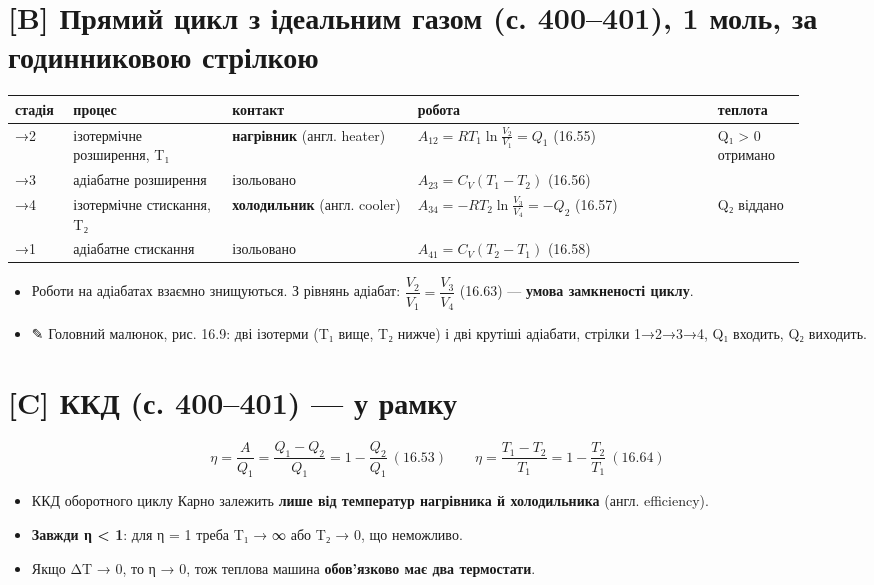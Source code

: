 \documentclass[11pt,a4paper,oneside]{book}
\newcommand{\pen}{{\sffamily\color{accent}✎}}
\begin{document}
\section*{[B] Прямий цикл з ідеальним газом (с. 400–401), 1 моль, за годинниковою стрілкою}
{\footnotesize
\begin{longtable}{>{\raggedright\arraybackslash}p{0.069\linewidth}>{\raggedright\arraybackslash}p{0.184\linewidth}>{\raggedright\arraybackslash}p{0.214\linewidth}>{\raggedright\arraybackslash}p{0.345\linewidth}>{\raggedright\arraybackslash}p{0.108\linewidth}}
\toprule
\textbf{стадія} & \textbf{процес} & \textbf{контакт} & \textbf{робота} & \textbf{теплота} \\
\midrule
\endhead
1→2 & ізотермічне розширення, T₁ & \textbf{нагрівник} (англ. heater) & $A_{12} = RT_1\ln\frac{V_2}{V_1} = Q_1$ (16.55) & Q₁ > 0 отримано \\
2→3 & адіабатне розширення & ізольовано & $A_{23} = C_V(T_1 - T_2)$ (16.56) & 0 \\
3→4 & ізотермічне стискання, T₂ & \textbf{холодильник} (англ. cooler) & $A_{34} = -RT_2\ln\frac{V_3}{V_4} = -Q_2$ (16.57) & Q₂ віддано \\
4→1 & адіабатне стискання & ізольовано & $A_{41} = C_V(T_2 - T_1)$ (16.58) & 0 \\
\bottomrule
\end{longtable}
}
\begin{itemize}
\item Роботи на адіабатах взаємно знищуються. З рівнянь адіабат: $\dfrac{V_2}{V_1} = \dfrac{V_3}{V_4}$ (16.63) — \textbf{умова замкненості циклу}.
\item \pen{} Головний малюнок, рис. 16.9: дві ізотерми (T₁ вище, T₂ нижче) і дві крутіші адіабати, стрілки 1→2→3→4, Q₁ входить, Q₂ виходить.
\end{itemize}

\section*{[C] ККД (с. 400–401) — у рамку}
\[\eta = \frac A{Q_1} = \frac{Q_1 - Q_2}{Q_1} = 1 - \frac{Q_2}{Q_1}\ (16.53)\qquad \eta = \frac{T_1 - T_2}{T_1} = 1 - \frac{T_2}{T_1}\ (16.64)\]
\begin{itemize}
\item ККД оборотного циклу Карно залежить \textbf{лише від температур нагрівника й холодильника} (англ. efficiency).
\item \textbf{Завжди η < 1}: для η = 1 треба T₁ → ∞ або T₂ → 0, що неможливо.
\item Якщо ΔT → 0, то η → 0, тож теплова машина \textbf{обов'язково має два термостати}.
\end{itemize}
\end{document}
